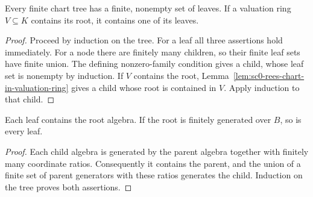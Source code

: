\begin{lemma}\label{lem:sc0-rees-tree-cover}
\leanok
Every finite chart tree has a finite, nonempty set of leaves. If a valuation ring $V\subseteq K$
contains its root, it contains one of its leaves.
\end{lemma}
\begin{proof}
Proceed by induction on the tree. For a leaf all three assertions hold immediately.
For a node there are finitely many children, so their finite leaf sets have finite union.
The defining nonzero-family condition gives a child, whose leaf set is nonempty by induction.
If $V$ contains the root, Lemma~\ref{lem:sc0-rees-chart-in-valuation-ring} gives a child whose root
is contained in $V$. Apply induction to that child.
\end{proof}

\begin{lemma}\label{lem:sc0-rees-tree-finite-type}
\leanok
Each leaf contains the root algebra. If the root is finitely generated over $B$, so is every leaf.
\end{lemma}
\begin{proof}
Each child algebra is generated by the parent algebra together with finitely many coordinate
ratios. Consequently it contains the parent, and the union of a finite set of parent generators
with these ratios generates the child. Induction on the tree proves both assertions.
\end{proof}
